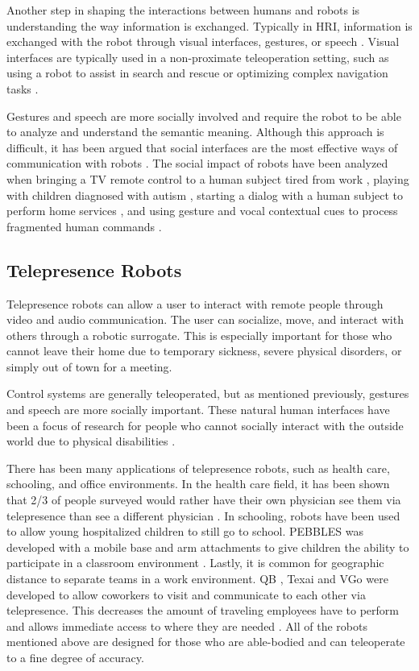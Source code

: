 \documentclass{article}
\begin{document}
Another step in shaping the interactions between humans and robots is understanding the way information is exchanged. Typically in HRI, information is exchanged with the robot through visual interfaces, gestures, or speech \cite{Goodrich:2007:HIS:1348099.1348100}. Visual interfaces are typically used in a non-proximate teleoperation setting, such as using a robot to assist in search and rescue \cite{1400783, Kadous:2006:EUI:1121241.1121285} or optimizing complex navigation tasks \cite{Nielsen:2006:CUV:1121241.1121259}.

Gestures and speech are more socially involved and require the robot to be able to analyze and understand the semantic meaning. Although this approach is difficult, it has been argued that social interfaces are the most effective ways of communication with robots \cite{Reeves:1996:MEP:236605}. The social impact of robots have been analyzed when bringing a TV remote control to a human subject tired from work \cite{Dautenhahn06howmay}, playing with children diagnosed with autism \cite{Robins}, starting a dialog with a human subject to perform home services \cite{1570701}, and using gesture and vocal contextual cues to process fragmented human commands \cite{810050}.

\subsection{Telepresence Robots}
Telepresence robots can allow a user to interact with remote people through video and audio communication. The user can socialize, move, and interact with others through a robotic surrogate. This is especially important for those who cannot leave their home due to temporary sickness, severe physical disorders, or simply out of town for a meeting. 

Control systems are generally teleoperated, but as mentioned previously, gestures and speech are more socially important. These natural human interfaces have been a focus of research for people who cannot socially interact with the outside world due to physical disabilities \cite{6705424}. 

There has been many applications of telepresence robots, such as health care, schooling, and office environments. In the health care field, it has been shown that 2/3 of people surveyed would rather have their own physician see them via telepresence than see a different physician \cite{doi:10.1001/archsurg.142.12.1177}. In schooling, robots have been used to allow young hospitalized children to still go to school. PEBBLES was developed with a mobile base and arm attachments to give children the ability to participate in a classroom environment \cite{Williams_usingpebbles}. Lastly, it is common for geographic distance to separate teams in a work environment. QB \cite{Anybots}, Texai \cite{Texai} and VGo \cite{VGo} were developed to allow coworkers to visit and communicate to each other via telepresence. This decreases the amount of traveling employees have to perform and allows immediate access to where they are needed \cite{Kristoffersson:2013:RMR:2514033.2514036}. All of the robots mentioned above are designed for those who are able-bodied and can teleoperate to a fine degree of accuracy.  
\end{document}
